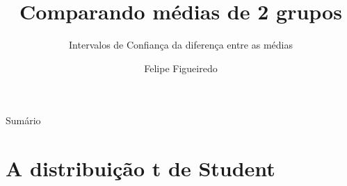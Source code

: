 \documentclass{beamer}
\title%
{Comparando médias de 2 grupos}
\subtitle
{Intervalos de Confiança da diferença entre as médias} %
\author%
{Felipe Figueiredo}%
\institute[] %
{
}
\date%
{}
\begin{document}
\begin{frame}
  \titlepage
\end{frame}

\begin{frame}{Sumário}
  \tableofcontents
\end{frame}








\section[t de Student]{A distribuição t de Student}
\end{document}
